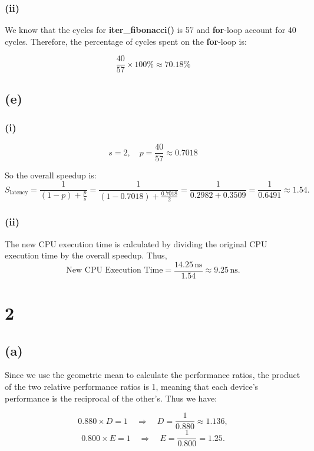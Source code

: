 \documentclass[12pt]{article}
\begin{document}
\subsubsection*{(ii)}

We know that the cycles for \textbf{iter\_fibonacci()} is 57 and \textbf{for}-loop account for 40 cycles. Therefore, the percentage of cycles spent on the \textbf{for}-loop is:

$$
\frac{40}{57} \times 100\% \approx 70.18\%
$$

\subsection*{(e)}

\subsubsection*{(i)}

$$
s = 2, \quad p = \frac{40}{57} \approx 0.7018
$$

So the overall speedup is:
$$
S_{\text{latency}} = \frac{1}{(1-p) + \frac{p}{s}} 
= \frac{1}{(1-0.7018) + \frac{0.7018}{2}} 
= \frac{1}{0.2982 + 0.3509} 
= \frac{1}{0.6491} \approx 1.54.
$$

\subsubsection*{(ii)}

The new CPU execution time is calculated by dividing the original CPU execution time by the overall speedup. Thus,
$$
\text{New CPU Execution Time} = \frac{14.25\,\text{ns}}{1.54} \approx 9.25\,\text{ns}.
$$

\section*{2}

\subsection*{(a)}

Since we use the geometric mean to calculate the performance ratios, the product of the two relative performance ratios is 1, meaning that each device’s performance is the reciprocal of the other's. Thus we have:

$$
0.880 \times D = 1 \quad \Rightarrow \quad D = \frac{1}{0.880} \approx 1.136,
$$
$$
0.800 \times E = 1 \quad \Rightarrow \quad E = \frac{1}{0.800} = 1.25.
$$
\end{document}
